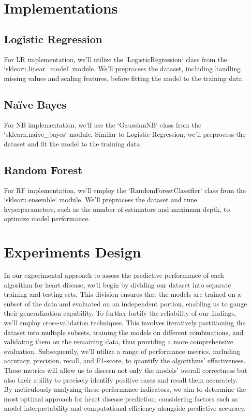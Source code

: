 \section{Implementations}
\subsection{Logistic Regression}
For LR implementation, we'll utilize the `LogisticRegression` class from the `sklearn.linear\_model` module. We'll preprocess the dataset, including handling missing values and scaling features, before fitting the model to the training data.
\subsection{Naïve Bayes}
For NB implementation, we'll use the `GaussianNB` class from the `sklearn.naive\_bayes` module. Similar to Logistic Regression, we'll preprocess the dataset and fit the model to the training data.
\subsection{Random Forest}
For RF implementation, we'll employ the `RandomForestClassifier` class from the `sklearn.ensemble` module. We'll preprocess the dataset and tune hyperparameters, such as the number of estimators and maximum depth, to optimize model performance.

\section{Experiments Design}
In our experimental approach to assess the predictive performance of each algorithm for heart disease, we'll begin by dividing our dataset into separate training and testing sets. This division ensures that the models are trained on a subset of the data and evaluated on an independent portion, enabling us to gauge their generalization capability. To further fortify the reliability of our findings, we'll employ cross-validation techniques. This involves iteratively partitioning the dataset into multiple subsets, training the models on different combinations, and validating them on the remaining data, thus providing a more comprehensive evaluation. Subsequently, we'll utilize a range of performance metrics, including accuracy, precision, recall, and F1-score, to quantify the algorithms' effectiveness. These metrics will allow us to discern not only the models' overall correctness but also their ability to precisely identify positive cases and recall them accurately. By meticulously analyzing these performance indicators, we aim to determine the most optimal approach for heart disease prediction, considering factors such as model interpretability and computational efficiency alongside predictive accuracy.

